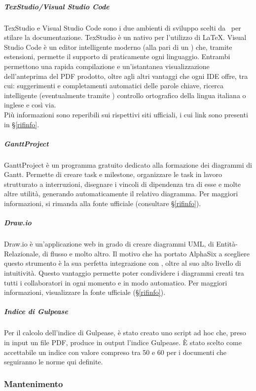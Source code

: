 			\subparagraph{TexStudio/Visual Studio Code}
			TexStudio e Visual Studio Code sono i due ambienti di sviluppo scelti da \gruppo\ per stilare la documentazione.
			TexStudio è un  nativo per l'utilizzo di \LaTeX. Visual Studio Code è un editor intelligente moderno (alla pari di un ) che, tramite
			estensioni, permette il supporto di praticamente ogni linguaggio.
			Entrambi permettono una rapida compilazione e un'istantanea visualizzazione dell'anteprima del PDF prodotto, oltre agli altri vantaggi che ogni IDE offre,
			tra cui: suggerimenti e completamenti automatici delle parole chiave, ricerca intelligente (eventualmente tramite ) controllo ortografico della
			lingua italiana o inglese e così via.\\
			Più informazioni sono reperibili sui rispettivi siti ufficiali, i cui link sono presenti in \S\ref{rifinfo}.

			\subparagraph{GanttProject} %
			GanttProject è un programma gratuito dedicato alla formazione dei diagrammi di Gantt. Permette di creare task e milestone, organizzare le task in lavoro strutturato a interruzioni, disegnare i vincoli di dipendenza tra di esse e molte altre utilità, generando automaticamente il relativo diagramma.
			Per maggiori informazioni, si rimanda alla fonte ufficiale (consultare \S\ref{rifinfo}).

			\subparagraph{Draw.io}
			Draw.io è un'applicazione web in grado di creare diagrammi UML, di Entità-Relazionale, di flusso e molto altro. Il motivo che ha portato AlphaSix a scegliere questo strumento è la sua perfetta integrazione con , oltre al suo alto livello di intuitività. Questo vantaggio permette poter condividere i diagrammi creati tra tutti i collaboratori in ogni momento e in modo automatico. Per maggiori informazioni, visualizzare la fonte ufficiale (\S\ref{rifinfo}).

			\subparagraph{Indice di Gulpease}
			Per il calcolo dell'indice di Gulpease, è stato creato uno script ad hoc che, preso in input un file PDF, produce in output l'indice Gulpease.
			È stato scelto come accettabile un indice con valore compreso tra 50 e 60 per i documenti che seguiranno le norme qui definite.

		\subsubsection{Mantenimento}

